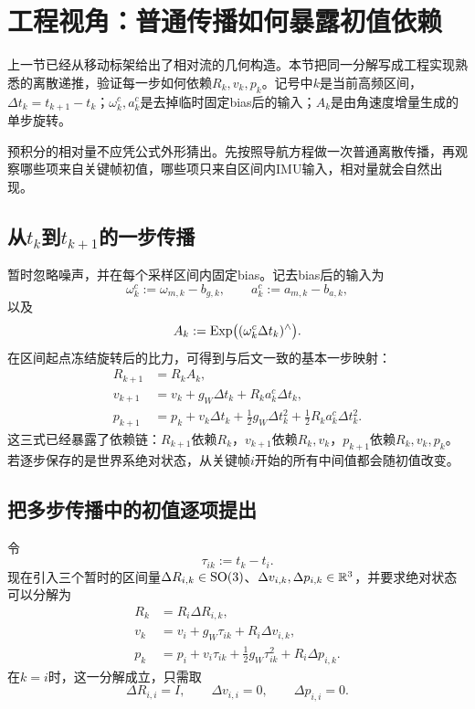 \section{工程视角：普通传播如何暴露初值依赖}

上一节已经从移动标架给出了相对流的几何构造。本节把同一分解写成工程实现熟悉的离散递推，验证每一步如何依赖$R_k,v_k,p_k$。记号中$k$是当前高频区间，$\Delta t_k=t_{k+1}-t_k$；$\omega_k^c,a_k^c$是去掉临时固定bias后的输入；$A_k$是由角速度增量生成的单步旋转。

预积分的相对量不应凭公式外形猜出。先按照导航方程做一次普通离散传播，再观察哪些项来自关键帧初值，哪些项只来自区间内IMU输入，相对量就会自然出现。

\subsection{从$t_k$到$t_{k+1}$的一步传播}

暂时忽略噪声，并在每个采样区间内固定bias。记去bias后的输入为
\[
    \omega_k^c:=\omega_{m,k}-b_{g,k},
    \qquad
    a_k^c:=a_{m,k}-b_{a,k},
\]
以及
\[
    A_k:=\operatorname{Exp}\bigl((\omega_k^c\Delta t_k)^\wedge\bigr).
\]
在区间起点冻结旋转后的比力，可得到与后文一致的基本一步映射：
\[
\boxed{
\begin{aligned}
    R_{k+1}
    &=R_kA_k,\\
    v_{k+1}
    &=v_k+g_W\Delta t_k+R_ka_k^c\Delta t_k,\\
    p_{k+1}
    &=p_k+v_k\Delta t_k
      +\frac12g_W\Delta t_k^2
      +\frac12R_ka_k^c\Delta t_k^2.
\end{aligned}
}
\]
这三式已经暴露了依赖链：$R_{k+1}$依赖$R_k$，$v_{k+1}$依赖$R_k,v_k$，$p_{k+1}$依赖$R_k,v_k,p_k$。若逐步保存的是世界系绝对状态，从关键帧$i$开始的所有中间值都会随初值改变。

\subsection{把多步传播中的初值逐项提出}

令
\[
    \tau_{ik}:=t_k-t_i.
\]
现在引入三个暂时的区间量$\Delta R_{i,k}\in\operatorname{SO}(3)$、$\Delta v_{i,k},\Delta p_{i,k}\in\mathbb{R}^3$，并要求绝对状态可以分解为
\[
\boxed{
\begin{aligned}
    R_k&=R_i\Delta R_{i,k},\\
    v_k&=v_i+g_W\tau_{ik}+R_i\Delta v_{i,k},\\
    p_k&=p_i+v_i\tau_{ik}
      +\frac12g_W\tau_{ik}^2+R_i\Delta p_{i,k}.
\end{aligned}
}
\]
在$k=i$时，这一分解成立，只需取
\[
    \Delta R_{i,i}=I,
    \qquad
    \Delta v_{i,i}=0,
    \qquad
    \Delta p_{i,i}=0.
\]

